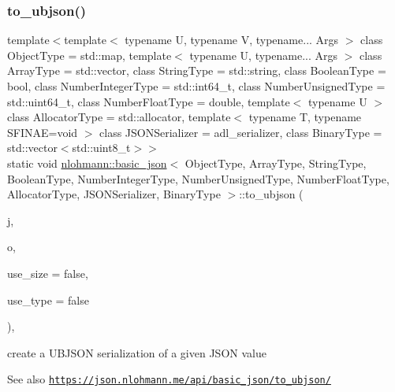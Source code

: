 \subsubsection{\texorpdfstring{to\+\_\+ubjson()}{to\_ubjson()}\hspace{0.1cm}{\footnotesize\ttfamily [2/3]}}
{\footnotesize\ttfamily template$<$template$<$ typename U, typename V, typename... Args $>$ class Object\+Type = std\+::map, template$<$ typename U, typename... Args $>$ class Array\+Type = std\+::vector, class String\+Type  = std\+::string, class Boolean\+Type  = bool, class Number\+Integer\+Type  = std\+::int64\+\_\+t, class Number\+Unsigned\+Type  = std\+::uint64\+\_\+t, class Number\+Float\+Type  = double, template$<$ typename U $>$ class Allocator\+Type = std\+::allocator, template$<$ typename T, typename S\+F\+I\+N\+A\+E=void $>$ class J\+S\+O\+N\+Serializer = adl\+\_\+serializer, class Binary\+Type  = std\+::vector$<$std\+::uint8\+\_\+t$>$$>$ \\
static void \hyperlink{classnlohmann_1_1basic__json}{nlohmann\+::basic\+\_\+json}$<$ Object\+Type, Array\+Type, String\+Type, Boolean\+Type, Number\+Integer\+Type, Number\+Unsigned\+Type, Number\+Float\+Type, Allocator\+Type, J\+S\+O\+N\+Serializer, Binary\+Type $>$\+::to\+\_\+ubjson (\begin{DoxyParamCaption}\item[{const \hyperlink{classnlohmann_1_1basic__json}{basic\+\_\+json}$<$ Object\+Type, Array\+Type, String\+Type, Boolean\+Type, Number\+Integer\+Type, Number\+Unsigned\+Type, Number\+Float\+Type, Allocator\+Type, J\+S\+O\+N\+Serializer, Binary\+Type $>$ \&}]{j,  }\item[{\hyperlink{classnlohmann_1_1detail_1_1output__adapter}{detail\+::output\+\_\+adapter}$<$ std\+::uint8\+\_\+t $>$}]{o,  }\item[{const bool}]{use\+\_\+size = {\ttfamily false},  }\item[{const bool}]{use\+\_\+type = {\ttfamily false} }\end{DoxyParamCaption})\hspace{0.3cm}{\ttfamily [inline]}, {\ttfamily [static]}}



create a U\+B\+J\+S\+ON serialization of a given J\+S\+ON value 

\begin{DoxySeeAlso}{See also}
\href{https://json.nlohmann.me/api/basic_json/to_ubjson/}{\tt https\+://json.\+nlohmann.\+me/api/basic\+\_\+json/to\+\_\+ubjson/} 
\end{DoxySeeAlso}
\mbox{\label{classnlohmann_1_1basic__json_a6d133cf7b2e729e9e215edeba5726116}} 

